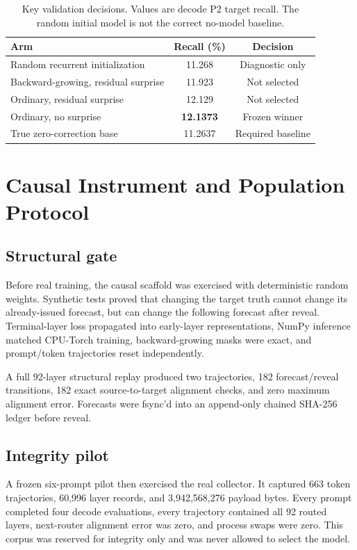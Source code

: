 \documentclass[11pt]{article}
\begin{document}
\begin{table}[t]
\centering
\caption{Key validation decisions. Values are decode P2 target recall. The random initial model is not the correct no-model baseline.}
\label{tab:ablations}
\begin{tabular}{lcc}
\toprule
Arm & Recall (\%) & Decision \\
\midrule
Random recurrent initialization & 11.268 & Diagnostic only \\
Backward-growing, residual surprise & 11.923 & Not selected \\
Ordinary, residual surprise & 12.129 & Not selected \\
Ordinary, no surprise & \textbf{12.1373} & Frozen winner \\
True zero-correction base & 11.2637 & Required baseline \\
\bottomrule
\end{tabular}
\end{table}

\section{Causal Instrument and Population Protocol}

\subsection{Structural gate}

Before real training, the causal scaffold was exercised with deterministic random weights. Synthetic tests proved that changing the target truth cannot change its already-issued forecast, but can change the following forecast after reveal. Terminal-layer loss propagated into early-layer representations, NumPy inference matched CPU-Torch training, backward-growing masks were exact, and prompt/token trajectories reset independently.

A full 92-layer structural replay produced two trajectories, 182 forecast/reveal transitions, 182 exact source-to-target alignment checks, and zero maximum alignment error. Forecasts were fsync'd into an append-only chained SHA-256 ledger before reveal.

\subsection{Integrity pilot}

A frozen six-prompt pilot then exercised the real collector. It captured 663 token trajectories, 60,996 layer records, and 3,942,568,276 payload bytes. Every prompt completed four decode evaluations, every trajectory contained all 92 routed layers, next-router alignment error was zero, and process swaps were zero. This corpus was reserved for integrity only and was never allowed to select the model.
\end{document}
